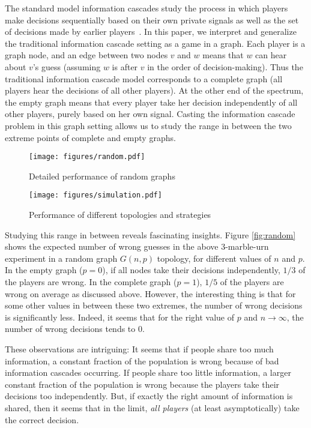 \documentclass[a4paper,UKenglish]{lipics}
\theoremstyle{definition}
\begin{document}
The standard model information cascades study the process in which 
	players make decisions sequentially based on their own private signals 
	as well as the set of decisions made by earlier players~\cite{Banerjee, B.H.W, Welch}. 
In this paper, we interpret and generalize the traditional information cascade setting as a game in a graph. 
Each player is a graph node, 
	and an edge between two nodes $v$ and $w$ means that $w$ can hear about $v$'s guess 
	(assuming $w$ is after $v$ in the order of decision-making). 
Thus the traditional information cascade model corresponds to a complete graph 
	(all players hear the decisions of all other players). 
At the other end of the spectrum, 
	the empty graph means that every player take her decision independently of all other players, 
	purely based on her own signal.
Casting the information cascade problem in this graph setting 
	allows us to study the range in between the two extreme points of complete and empty graphs. 

\begin{figure}
	\begin{minipage}{2in}
    		\texttt{[image: figures/random.pdf]}
		\caption{Detailed performance of random graphs}
		\label{fig:random}
	\end{minipage}
	\hspace{1in}
	\begin{minipage}{2in}
		\texttt{[image: figures/simulation.pdf]}
		\caption{Performance of different topologies and strategies}
		\label{fig:simulation}
	\end{minipage}
\end{figure}

Studying this range in between reveals fascinating insights. 
Figure \ref{fig:random} shows the expected number of wrong guesses 
	in the above 3-marble-urn experiment in a random graph $G(n,p)$ topology, 
	for different values of $n$ and $p$. 
In the empty graph ($p=0$), if all nodes take their decisions independently, $1/3$ of the players are wrong. 
In the complete graph ($p=1$), $1/5$ of the players are wrong on average as discussed above. 
However, the interesting thing is that for some other values in between these two extremes,
	the number of wrong decisions is significantly less. 
Indeed, it seems that for the right value of $p$ and $n\rightarrow\infty$, the number of wrong decisions tends to $0$. 

These observations are intriguing: 
	It seems that if people share too much information, 
	a constant fraction of the population is wrong because of bad information cascades occurring. 
If people share too little information, 
	a larger constant fraction of the population is wrong because the players take their decisions too independently. 
But, if exactly the right amount of information is shared, 
	then it seems that in the limit, \emph{all players} (at least asymptotically) take the correct decision. 
\end{document}

